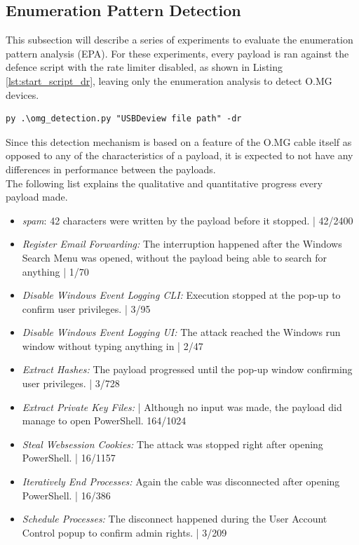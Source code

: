 \fi



\subsection{Enumeration Pattern Detection}

This subsection will describe a series of experiments to evaluate the enumeration pattern analysis (EPA). For these experiments, every payload is ran against the defence script with the rate limiter disabled, as shown in Listing \ref{lst:start_script_dr}, leaving only the enumeration analysis to detect O.MG devices.

\begin{lstlisting}[caption={start Defense Script with Rate Limiter disabled},label={lst:start_script_dr}, captionpos=b]
 py .\omg_detection.py "USBDeview file path" -dr
\end{lstlisting}

Since this detection mechanism is based on a feature of the O.MG cable itself as opposed to any of the characteristics of a payload, it is expected to not have any differences in performance between the payloads. \\
The following list explains the qualitative and quantitative progress every payload made.

\begin{itemize}
    \item  \emph{spam}: 42 characters were written by the payload before it stopped. | 42/2400
    \item  \emph{Register Email Forwarding:} The interruption happened after the Windows Search Menu was opened, without the payload being able to search for anything  |  1/70 
    \item  \emph{Disable Windows Event Logging CLI:}  Execution stopped at the pop-up to confirm user privileges. | 3/95
    \item  \emph{Disable Windows Event Logging UI:} The attack reached the Windows run window without typing anything in | 2/47
    \item  \emph{Extract Hashes:}  The payload progressed until the pop-up window confirming user privileges. | 3/728 
    \item  \emph{Extract Private Key Files:}  | Although no input was made, the payload did manage to open PowerShell. 164/1024
    \item  \emph{Steal Websession Cookies:} The attack was stopped right after opening PowerShell. | 16/1157
    \item  \emph{Iteratively End Processes:} Again the cable was disconnected after opening PowerShell. | 16/386
    \item  \emph{Schedule Processes:} The disconnect happened during the User Account Control popup to confirm admin rights. | 3/209
\end{itemize}

